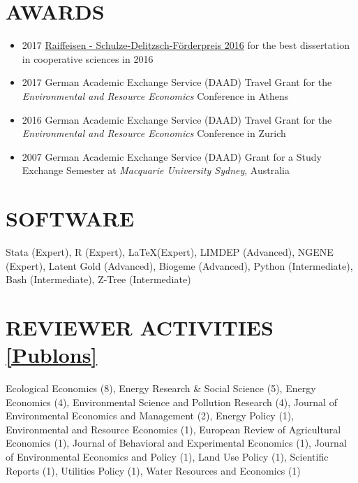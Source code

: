 \documentclass[paper=a4,fontsize=11pt]{scrartcl} %
\newcommand{\NewPart}[2]{\section*{\uppercase{#1} #2}}
\begin{document}
 \NewPart{Awards}{}
 \begin{itemize}
 
 
\item 2017 \href{https://www.agrar.hu-berlin.de/de/institut/departments/daoe/koopwiss/ifg/forschung/wissenschaftlicher-nachwuchs/raiffeisen-schulze-delitzsch-foerderpreis}{Raiffeisen - Schulze-Delitzsch-Förderpreis 2016} for the best dissertation in cooperative sciences in 2016
 \item 2017 German Academic Exchange Service (DAAD) Travel Grant for the \textit{Environmental and Resource Economics} Conference in Athens
 \item 2016 German Academic Exchange Service (DAAD) Travel Grant for the \textit{Environmental and Resource Economics} Conference in Zurich
 \item 2007 German Academic Exchange Service (DAAD) Grant for a Study Exchange Semester at \textit{Macquarie University Sydney}, Australia

\end{itemize}





\NewPart{Software}{}
Stata (Expert), R (Expert), \LaTeX (Expert),  LIMDEP (Advanced), NGENE (Expert), Latent Gold (Advanced), Biogeme (Advanced), Python (Intermediate), Bash (Intermediate), Z-Tree (Intermediate)

\NewPart{Reviewer Activities}{\href{https://publons.com/a/1337890}{[Publons]}}
Ecological Economics (8), Energy Research \& Social Science (5), 
Energy Economics (4), 
Environmental Science and Pollution Research (4), Journal of Environmental Economics and Management 
(2), 
Energy Policy (1),
 Environmental and Resource Economics (1), European Review of Agricultural Economics (1), Journal of Behavioral and Experimental Economics (1), 
 Journal of Environmental Economics and Policy
(1), Land Use Policy
(1), Scientific Reports
(1), Utilities Policy
(1), Water Resources and Economics (1)
\end{document}
